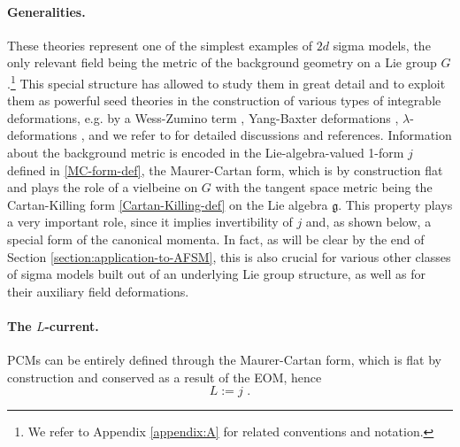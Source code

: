 \documentclass[12pt]{article}
\numberwithin{equation}{section}
\begin{document}
\paragraph{Generalities.} These theories represent one of the simplest examples of $2d$ sigma models, the only relevant field being the metric of the background geometry on a Lie group $G$.\footnote{We refer to Appendix \ref{appendix:A} for related conventions and notation.} This special structure has allowed to study them in great detail \cite{Luscher:1977rq,Luscher:1977uq,Wiegmann:1984pw,Polyakov:1984et,Faddeev:1985qu,Ogievetsky:1987vv} and to exploit them as powerful seed theories in the construction of various types of integrable deformations, e.g. by a Wess-Zumino term \cite{Wess:1971yu,Novikov:1982ei,Abdalla:1982yd,Witten:1983ar}, Yang-Baxter deformations \cite{Klimcik:2002zj,Klimcik:2008eq}, $\lambda$-deformations \cite{Sfetsos:2013wia}, and we refer to \cite{Zarembo:2017muf,Lacroix:2018njs,Seibold:2020ouf,Hoare:2021dix,Borsato:2023dis} for detailed discussions and references. Information about the background metric is encoded in the Lie-algebra-valued 1-form $j$ defined in \eqref{MC-form-def}, the Maurer-Cartan form, which is by construction flat and plays the role of a vielbeine on $G$ with the tangent space metric being the Cartan-Killing form \eqref{Cartan-Killing-def} on the Lie algebra $\mathfrak{g}$. This property plays a very important role, since it implies invertibility of $j$ and, as shown below, a special form of the canonical momenta. In fact, as will be clear by the end of Section \ref{section:application-to-AFSM}, this is also crucial for various other classes of sigma models built out of an underlying Lie group structure, as well as for their auxiliary field deformations.


\paragraph{The $L$-current.} PCMs can be entirely defined through the Maurer-Cartan form, which is flat by construction and conserved as a result of the EOM, hence
\begin{equation}
L:=j \,\, .
\end{equation}
\end{document}
